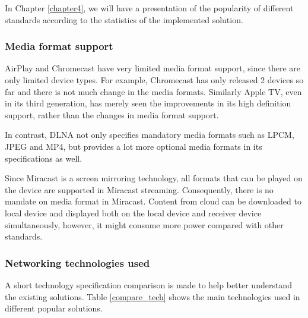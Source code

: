 In Chapter \ref{chapter4}, we will have a presentation of the popularity of
different standards according to the statistics of the implemented solution.
\subsubsection{Media format support\label{2_3_3_1}} 
AirPlay and Chromecast have very limited media format support, since there are 
only limited device types. For example, Chromecast has only released 2 devices
so far and there is not much change in the media formats. Similarly Apple TV,
even in its third generation,  has merely seen the improvements in its high
definition support, rather than the changes in media format support.

In contrast, DLNA not only specifies mandatory media formats such as LPCM, JPEG
and MP4, but provides a lot more optional media formats in its specifications
as well.

Since Miracast is a screen mirroring technology, all formats that can be played
on the device are supported in Miracast streaming. Consequently, there is no
mandate on media format in Miracast. Content from
cloud can be downloaded to local device and displayed both on the local device
and receiver device simultaneously, however, it might consume more power
compared with other standards. 
\subsubsection{Networking technologies used\label{2_3_3_2}}
A short technology specification comparison is made to help better understand
the existing solutions. Table \ref{compare_tech} shows the main technologies
used in different popular solutions.

\begin{table}[htb] 
\caption{Comparison of used technologies\label{compare_tech}} 
\begin{center} 
\end{center} 
\end{table} 

